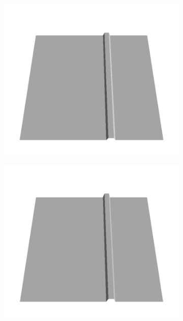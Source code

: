 \documentclass[../document.tex]{subfiles}
\begin{document}
\begin{figure}[H]
\begin{subfigure}[b]{0.24\textwidth}
    \end{subfigure}
    \begin{subfigure}[b]{0.24\textwidth}
    \includegraphics[width=\linewidth]{../img/5/custom_patches/walls_increasing/all/10-3d.png}
    \end{subfigure}
    \begin{subfigure}[b]{0.24\textwidth}
    \includegraphics[width=\linewidth]{../img/5/custom_patches/walls_increasing/all/15-3d.png}

\end{subfigure}
\end{figure}
\end{document}
